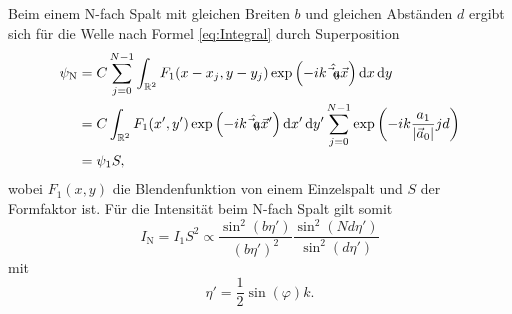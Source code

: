 Beim einem N-fach Spalt mit gleichen Breiten $b$ und gleichen Abständen $d$ ergibt sich für die Welle nach Formel \eqref{eq:Integral} durch Superposition
\begin{equation}
\begin{split}
	\psi_\text{N} &=  C \sum\limits_{j=0}^{N-1} \int_{\mathbb{R}^2} F_1(x-x_j,y-y_j) \exp\left(-i k \hat{\vec{a}_0} \vec{x}\right) \mathop{}\!\mathrm{d} x \mathop{}\!\mathrm{d} y \\
	&= C \int_{\mathbb{R}^2} F_1(x',y') \exp\left(-i k \hat{\vec{a}_0} \vec{x}'\right) \mathop{}\!\mathrm{d} x' \mathop{}\!\mathrm{d} y'  \sum\limits_{j=0}^{N-1} \exp\left(-i k \frac{a_1}{|\vec{a}_0|} j d \right) \\
	&= \psi_1 S,
\end{split}
\end{equation}
wobei $F_1(x,y)$ die Blendenfunktion von einem Einzelspalt und $S$ der Formfaktor ist.
Für die Intensität beim N-fach Spalt gilt somit
\begin{equation}
	I_\text{N} = I_1 S^2 \propto \frac{\sin^2(b \eta')}{(b\eta')^2}\frac{\sin^2(N d \eta')}{\sin^2(d\eta')}
\end{equation}
mit
\begin{equation}
	\eta'=\frac{1}{2} \sin(\varphi) k.
\end{equation}

